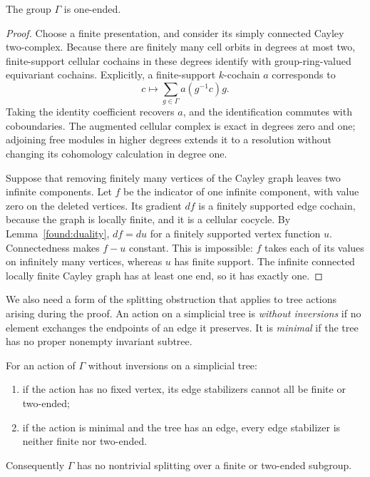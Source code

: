 \begin{lemma}\label{found:ends}
The group $\Gamma$ is one-ended.
\end{lemma}

\begin{proof}
Choose a finite presentation, and consider its simply connected
Cayley two-complex. Because there are finitely many cell orbits in
degrees at most two, finite-support cellular cochains in these
degrees identify with group-ring-valued equivariant cochains.
Explicitly, a finite-support $k$-cochain $a$ corresponds to
\[
 c\longmapsto\sum_{g\in\Gamma}a(g^{-1}c)g.
\]
Taking the identity coefficient recovers $a$, and the identification
commutes with coboundaries.
The augmented cellular complex is exact in degrees zero and one;
adjoining free modules in higher degrees extends it to a resolution
without changing its cohomology calculation in degree one.

Suppose that removing finitely many vertices of the Cayley graph
leaves two infinite components. Let $f$ be the indicator of one
infinite component, with value zero on the deleted vertices.
Its gradient $df$ is a finitely supported edge cochain, because
the graph is locally finite, and it is a cellular cocycle.
By Lemma~\ref{found:duality}, $df=du$ for a finitely supported
vertex function $u$. Connectedness makes $f-u$ constant.
This is impossible: $f$ takes each of its values on infinitely
many vertices, whereas $u$ has finite support.
The infinite connected locally finite Cayley graph has at least
one end, so it has exactly one.
\end{proof}

We also need a form of the splitting obstruction that applies to
tree actions arising during the proof. An action on a simplicial
tree is \emph{without inversions} if no element exchanges the
endpoints of an edge it preserves. It is \emph{minimal} if the
tree has no proper nonempty invariant subtree.

\begin{lemma}\label{found:trees}
For an action of $\Gamma$ without inversions on a simplicial tree:
\begin{enumerate}
\item if the action has no fixed vertex, its edge stabilizers
cannot all be finite or two-ended;
\item if the action is minimal and the tree has an edge, every
edge stabilizer is neither finite nor two-ended.
\end{enumerate}
Consequently $\Gamma$ has no nontrivial splitting over a finite
or two-ended subgroup.
\end{lemma}

